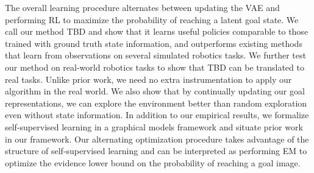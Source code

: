 The overall learning procedure alternates between updating the VAE and performing RL to maximize the probability of reaching a latent goal state.
We call our method TBD and show that it learns useful policies comparable to those trained with ground truth state information, and outperforms existing methods that learn from observations
on several simulated robotics tasks.
We further test our method on real-world robotics tasks to show that TBD can be translated to real tasks. Unlike prior work, we need no extra instrumentation to apply our algorithm in the real world.
We also show that by continually updating our goal representations, we can explore the environment better than random exploration even without state information.
In addition to our empirical results, we formalize self-supervised learning in a graphical models framework and situate prior work in our framework. Our alternating optimization procedure takes advantage of the structure of self-supervised learning and can be interpreted as performing EM to optimize the evidence lower bound on the probability of reaching a goal image.

\fi




